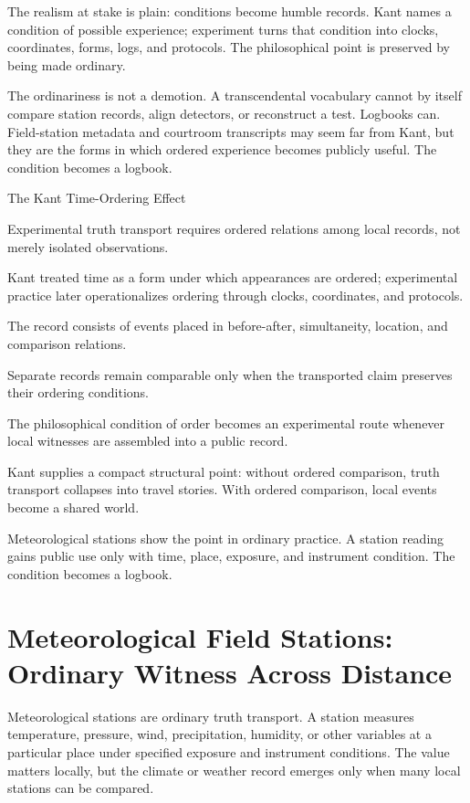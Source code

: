 The realism at stake is plain: conditions become humble records. Kant
names a condition of possible experience; experiment turns that
condition into clocks, coordinates, forms, logs, and protocols. The
philosophical point is preserved by being made ordinary.

The ordinariness is not a demotion. A transcendental vocabulary cannot
by itself compare station records, align detectors, or reconstruct a
test. Logbooks can. Field-station metadata and courtroom transcripts
may seem far from Kant, but they are the forms in which ordered
experience becomes publicly useful. The condition becomes a logbook.

\begin{phenom}{The Kant Time-Ordering Effect~\cite{kant1781}}
\label{ph:kant-time-ordering}

\PhStatement
Experimental truth transport requires ordered relations among local records,
not merely isolated observations.

\PhOrigin
Kant treated time as a form under which appearances are ordered; experimental
practice later operationalizes ordering through clocks, coordinates, and
protocols.

\PhObservation
The record consists of events placed in before-after, simultaneity, location,
and comparison relations.

\PhConstraint
Separate records remain comparable only when the transported claim
preserves their ordering conditions.

\PhConsequence
The philosophical condition of order becomes an experimental route whenever
local witnesses are assembled into a public record.
\end{phenom}

Kant supplies a compact structural point: without ordered comparison,
truth transport collapses into travel stories. With ordered comparison,
local events become a shared world.

Meteorological stations show the point in ordinary practice. A station
reading gains public use only with time, place, exposure, and instrument
condition. The condition becomes a logbook.

\section{Meteorological Field Stations: Ordinary Witness Across Distance}

Meteorological stations are ordinary truth transport. A station measures
temperature, pressure, wind, precipitation, humidity, or other variables
at a particular place under specified exposure and instrument
conditions. The value matters locally, but the climate or weather record
emerges only when many local stations can be compared.

